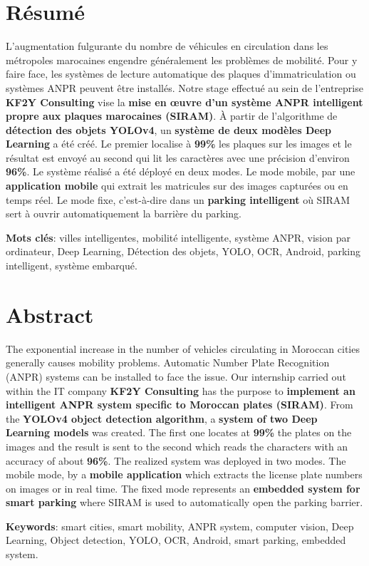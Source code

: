 \chapter*{Résumé}
L’augmentation fulgurante du nombre de véhicules en circulation  dans les métropoles marocaines engendre généralement les problèmes de mobilité. Pour y faire face, les systèmes de lecture automatique des plaques d’immatriculation ou systèmes ANPR peuvent être installés. Notre stage effectué au sein de l'entreprise \textbf{KF2Y Consulting} vise la \textbf{mise en œuvre d'un système ANPR intelligent propre aux plaques marocaines (SIRAM)}. À partir de l’algorithme de \textbf{détection des objets YOLOv4}, un \textbf{système de deux modèles Deep Learning} a été créé. Le premier localise à \textbf{99\%} les plaques sur les images et le résultat est envoyé au second qui lit les caractères avec une précision d'environ \textbf{96\%}. Le système réalisé a été déployé en deux modes. Le mode mobile, par une \textbf{application mobile} qui extrait les matricules sur des images capturées ou en temps réel. Le mode fixe, c'est-à-dire dans un \textbf{parking intelligent} où SIRAM sert à ouvrir automatiquement la barrière du parking.




\textbf{Mots clés}: villes intelligentes, mobilité intelligente, système ANPR, vision par ordinateur, Deep Learning, Détection des objets, YOLO, OCR, Android, parking intelligent, système embarqué.


\chapter*{Abstract}
The exponential increase in the number of vehicles circulating in Moroccan cities generally causes mobility problems. Automatic Number Plate Recognition (ANPR) systems can be installed to face the issue. Our internship carried out within the IT company \textbf{KF2Y Consulting} has the purpose to \textbf{implement an intelligent ANPR system specific to Moroccan plates (SIRAM)}. From the \textbf{YOLOv4 object detection algorithm}, a \textbf{system of two Deep Learning models} was created. The first one locates at \textbf{99\%} the plates on the images and the result is sent to the second which reads the characters with an accuracy of about \textbf{96\%}. The realized system was deployed in two modes. The mobile mode, by a \textbf{mobile application} which extracts the license plate numbers on images or in real time. The fixed mode represents an \textbf{embedded system for smart parking} where SIRAM is used to automatically open the parking barrier.


\textbf{Keywords}: smart cities, smart mobility, ANPR system, computer vision, Deep Learning, Object detection, YOLO, OCR, Android, smart parking, embedded system.